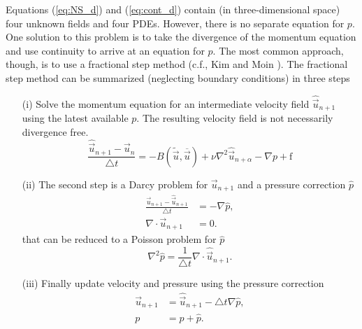 Equations (\ref{eq:NS_d}) and (\ref{eq:cont_d}) contain (in three-dimensional space) four unknown fields and four PDEs. However, there is no separate equation for $p$. One solution to this problem is to take the divergence of the momentum equation and use continuity to arrive at an equation for $p$. The most common approach, though, is to use a fractional step method (c.f., Kim and Moin \cite{kim85}). The fractional step method can be summarized (neglecting boundary conditions) in three steps
\begin{itemize}
 \item[(i)] Solve the momentum equation for an intermediate velocity field $\hat{\vec{u}}_{n+1}$ using the latest available $p$. The resulting velocity field is not necessarily divergence free.\\
\begin{equation}
\label{eq:NS_FS} \frac{\hat{\vec{u}}_{n+1}-\vec{u}_{n}}{\triangle t} = - B(\tilde{\vec{u}},\overline{\vec{u}}) + \nu \nabla^2 \hat{\vec{u}}_{n+\alpha} -\nabla p + \text{f}
\end{equation}
 \item[(ii)] The second step is a Darcy problem for $\vec{u}_{n+1}$ and a pressure correction $\hat{p}$
\begin{align}
 \label{eq:vel_Darcy} \frac{\vec{u}_{n+1} - \hat{\vec{u}}_{n+1}}{\triangle t} &=  - \nabla \hat{p}, \\
  \nabla \cdot \vec{u}_{n+1} &= 0.
\label{eq:update}
\end{align}
that can be reduced to a Poisson problem for $\hat{p}$
\begin{equation}
 \label{eq:PC} \nabla^2 \hat{p} = \frac{1}{\triangle t} \nabla \cdot \hat{\vec{u}}_{n+1}.
\end{equation}
 \item[(iii)] Finally update velocity and pressure using the pressure correction
\begin{align}
 \label{eq:vel_update} \vec{u}_{n+1} &= \hat{\vec{u}}_{n+1} - \triangle t \nabla \hat{p}, \\
  p &= p + \hat{p}.
\label{eq:update}
\end{align}
\end{itemize}
